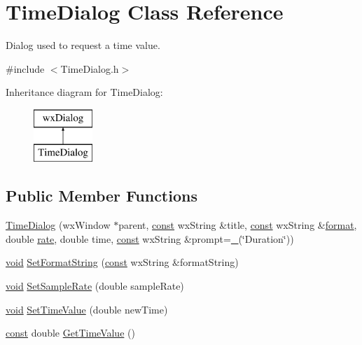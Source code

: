 \hypertarget{class_time_dialog}{}\section{Time\+Dialog Class Reference}
\label{class_time_dialog}


Dialog used to request a time value.  




{\ttfamily \#include $<$Time\+Dialog.\+h$>$}

Inheritance diagram for Time\+Dialog\+:\begin{figure}[H]
\begin{center}
\leavevmode
\includegraphics[height=2.000000cm]{class_time_dialog}
\end{center}
\end{figure}
\subsection*{Public Member Functions}
\begin{DoxyCompactItemize}
\item 
\hyperlink{class_time_dialog_a2798174b7b933adb7eae5856aace9a44}{Time\+Dialog} (wx\+Window $\ast$parent, \hyperlink{getopt1_8c_a2c212835823e3c54a8ab6d95c652660e}{const} wx\+String \&title, \hyperlink{getopt1_8c_a2c212835823e3c54a8ab6d95c652660e}{const} wx\+String \&\hyperlink{_export_p_c_m_8cpp_a317afff57d87a89158c2b038d37b2b08}{format}, double \hyperlink{seqread_8c_ad89d3fac2deab7a9cf6cfc8d15341b85}{rate}, double time, \hyperlink{getopt1_8c_a2c212835823e3c54a8ab6d95c652660e}{const} wx\+String \&prompt=\hyperlink{vr32_8c_ae4dfd7b0d66121016d6466d2ff10e8ba}{\+\_\+}(\char`\"{}Duration\char`\"{}))
\item 
\hyperlink{sound_8c_ae35f5844602719cf66324f4de2a658b3}{void} \hyperlink{class_time_dialog_ae36a5f082fe6a7ff4776717f72d30d4f}{Set\+Format\+String} (\hyperlink{getopt1_8c_a2c212835823e3c54a8ab6d95c652660e}{const} wx\+String \&format\+String)
\item 
\hyperlink{sound_8c_ae35f5844602719cf66324f4de2a658b3}{void} \hyperlink{class_time_dialog_a2446020a070b7e1cb814526b635cd931}{Set\+Sample\+Rate} (double sample\+Rate)
\item 
\hyperlink{sound_8c_ae35f5844602719cf66324f4de2a658b3}{void} \hyperlink{class_time_dialog_a429c685ec9fd287c955ce8d58ba3fa43}{Set\+Time\+Value} (double new\+Time)
\item 
\hyperlink{getopt1_8c_a2c212835823e3c54a8ab6d95c652660e}{const} double \hyperlink{class_time_dialog_a6ab86ef1ffed07bb1ce3f67099b1706b}{Get\+Time\+Value} ()
\end{DoxyCompactItemize}


